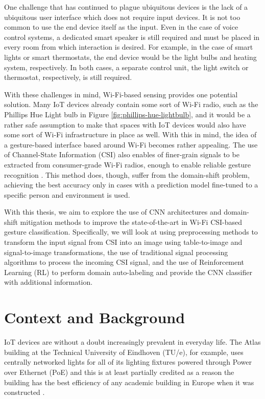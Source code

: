 One challenge that has continued to plague ubiquitous devices is the lack of a ubiquitous user interface which does not require input devices.
It is not too common to use the end device itself as the input.
Even in the case of voice control systems, a dedicated smart speaker is still required and must be placed in every room from which interaction is desired.
For example, in the case of smart lights or smart thermostats, the end device would be the light bulbs and heating system, respectively.
In both cases, a separate control unit, the light switch or thermostat, respectively, is still required.

With these challenges in mind, Wi-Fi-based sensing provides one potential solution.
Many IoT devices already contain some sort of Wi-Fi radio, such as the Phillips Hue Light bulb in Figure \ref{fig:phillips-hue-lightbulb}, and it would be a rather safe assumption to make that spaces with IoT devices would also have some sort of Wi-Fi infrastructure in place as well.
With this in mind, the idea of a gesture-based interface based around Wi-Fi becomes rather appealing.
The use of Channel-State Information (CSI) also enables of finer-grain signals to be extracted from consumer-grade Wi-Fi radios, enough to enable reliable gesture recognition \cite{adib2013see}.
This method does, though, suffer from the domain-shift problem, achieving the best accuracy only in cases with a prediction model fine-tuned to a specific person and environment is used.

With this thesis, we aim to explore the use of CNN architectures and domain-shift mitigation methods to improve the state-of-the-art in Wi-Fi CSI-based gesture classification.
Specifically, we will look at using preprocessing methods to transform the input signal from CSI into an image using table-to-image and signal-to-image transformations, the use of traditional signal processing algorithms to process the incoming CSI signal, and the use of Reinforcement Learning (RL) to perform domain auto-labeling and provide the CNN classifier with additional information.

\section{Context and Background}\label{sec:intro-context}

IoT devices are without a doubt increasingly prevalent in everyday life.
The Atlas building at the Technical University of Eindhoven (TU/e), for example, uses centrally networked lights for all of its lighting fixtures powered through Power over Ethernet (PoE) and this is at least partially credited as a reason the building has the best efficiency of any academic building in Europe when it was constructed \cite{tue2019atlas}.

